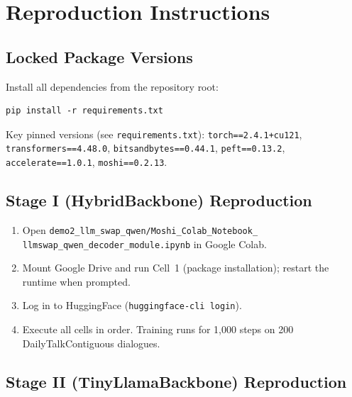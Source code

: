 \documentclass[conference]{IEEEtran}
\begin{document}
\section{Reproduction Instructions}
\label{app:repro}

\subsection{Locked Package Versions}

Install all dependencies from the repository root:

\begin{verbatim}
pip install -r requirements.txt
\end{verbatim}

Key pinned versions (see \texttt{requirements.txt}):
\texttt{torch==2.4.1+cu121},
\texttt{transformers==4.48.0},
\texttt{bitsandbytes==0.44.1},
\texttt{peft==0.13.2},
\texttt{accelerate==1.0.1},
\texttt{moshi==0.2.13}.

\subsection{Stage I (HybridBackbone) Reproduction}

\begin{enumerate}
  \item Open \texttt{demo2\_llm\_swap\_qwen/Moshi\_Colab\_Notebook\_\\
        llmswap\_qwen\_decoder\_module.ipynb} in Google Colab.
  \item Mount Google Drive and run Cell~1 (package installation);
        restart the runtime when prompted.
  \item Log in to HuggingFace (\texttt{huggingface-cli login}).
  \item Execute all cells in order. Training runs for 1,000 steps on
        200 DailyTalkContiguous dialogues.
\end{enumerate}

\subsection{Stage II (TinyLlamaBackbone) Reproduction}
\end{document}
